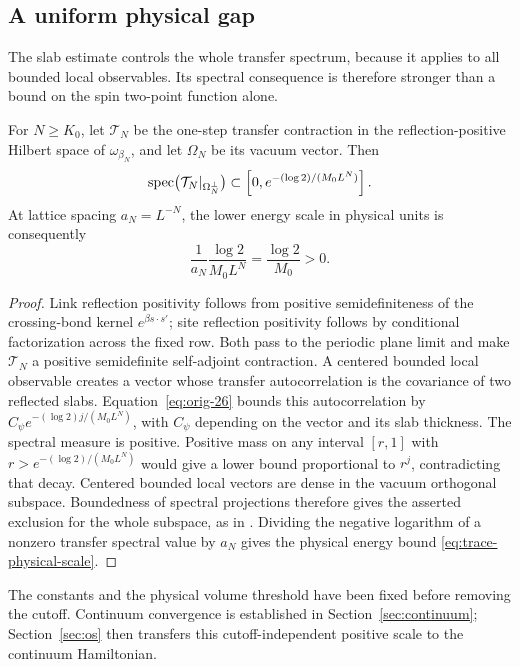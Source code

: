 \subsection{A uniform physical gap}

The slab estimate controls the whole transfer spectrum, because it
applies to all bounded local observables.  Its spectral consequence is
therefore stronger than a bound on the spin two-point function alone.

\begin{corollary}
\label{cor:trace-physical-gap}
For $N\ge K_0$, let $\mathcal T_N$ be the one-step transfer contraction
in the reflection-positive Hilbert space of $\omega_{\beta_N}$, and
let $\Omega_N$ be its vacuum vector.  Then
\[
 \operatorname{spec}\bigl(\mathcal T_N|_{\Omega_N^\perp}\bigr)
    \subset\left[0,e^{-(\log2)/(M_0L^N)}\right].
\]
At lattice spacing $a_N=L^{-N}$, the lower energy scale in physical
units is consequently
\begin{equation}
 \frac{1}{a_N}\frac{\log2}{M_0L^N}
       =\frac{\log2}{M_0}>0.
 \label{eq:trace-physical-scale}
\end{equation}
\end{corollary}

\begin{proof}
Link reflection positivity follows from positive semidefiniteness of
the crossing-bond kernel $e^{\beta s\cdot s'}$; site reflection
positivity follows by conditional factorization across the fixed row.
Both pass to the periodic plane limit and make $\mathcal T_N$ a
positive semidefinite self-adjoint contraction.
A centered bounded local observable creates a vector whose transfer
autocorrelation is the covariance of two reflected slabs.
Equation~\eqref{eq:orig-26} bounds this autocorrelation by
$C_\psi e^{-(\log2)j/(M_0L^N)}$, with $C_\psi$ depending on the vector
and its slab thickness.  The spectral measure is positive.  Positive
mass on any interval $[r,1]$ with
$r>e^{-(\log2)/(M_0L^N)}$ would give a lower bound proportional to
$r^j$, contradicting that decay.  Centered bounded local vectors are
dense in the vacuum orthogonal subspace.  Boundedness of spectral
projections therefore gives the asserted exclusion for the whole
subspace, as in .  Dividing the negative logarithm
of a nonzero transfer spectral value by $a_N$ gives the physical
energy bound \eqref{eq:trace-physical-scale}.
\end{proof}

The constants and the physical volume threshold have been fixed before
removing the cutoff.  Continuum convergence is established in
Section~\ref{sec:continuum}; Section~\ref{sec:os} then transfers this
cutoff-independent positive scale to the continuum Hamiltonian.

